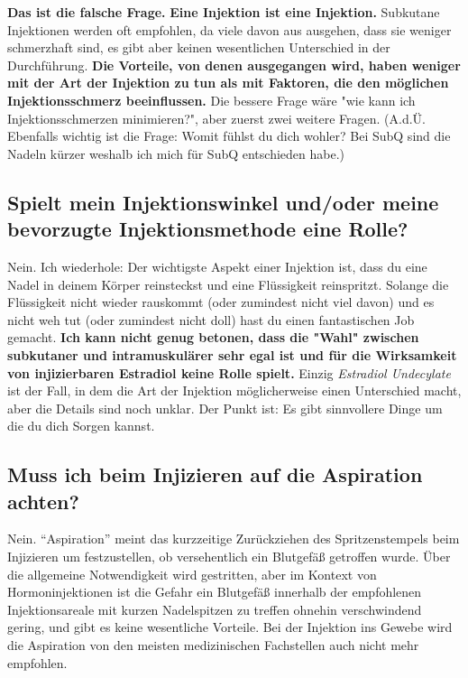 \documentclass{article}
\begin{document}
\textbf{Das ist die falsche Frage.} \textbf{Eine Injektion ist eine Injektion.} Subkutane Injektionen werden oft empfohlen, da viele davon aus ausgehen, dass sie weniger schmerzhaft sind, es gibt aber keinen wesentlichen Unterschied in der Durchführung. \textbf{Die Vorteile, von denen ausgegangen wird, haben weniger mit der Art der Injektion zu tun als mit Faktoren, die den möglichen Injektionsschmerz beeinflussen.} Die bessere Frage wäre "wie kann ich Injektionsschmerzen minimieren?", aber zuerst zwei weitere Fragen. (A.d.Ü. Ebenfalls wichtig ist die Frage: Womit fühlst du dich wohler? Bei SubQ sind die Nadeln kürzer weshalb ich mich für SubQ entschieden habe.)

\subsection{Spielt mein Injektionswinkel und/oder meine bevorzugte Injektionsmethode eine Rolle?}

Nein. Ich wiederhole: Der wichtigste Aspekt einer Injektion ist, dass du eine Nadel in deinem Körper reinsteckst und eine Flüssigkeit reinspritzt. Solange die Flüssigkeit nicht wieder rauskommt (oder zumindest nicht viel davon) und es nicht weh tut (oder zumindest nicht doll) hast du einen fantastischen Job gemacht. \textbf{Ich kann nicht genug betonen, dass die "Wahl" zwischen subkutaner und intramuskulärer sehr egal ist und für die Wirksamkeit von injizierbaren Estradiol keine Rolle spielt.} Einzig \textit{Estradiol Undecylate} ist der Fall, in dem die Art der Injektion möglicherweise einen Unterschied macht, aber die Details sind noch unklar. Der Punkt ist: Es gibt sinnvollere Dinge um die du dich Sorgen kannst.

\subsection{Muss ich beim Injizieren auf die Aspiration achten?}

Nein. “Aspiration” meint das kurzzeitige Zurückziehen des Spritzenstempels beim Injizieren um festzustellen, ob versehentlich ein Blutgefäß getroffen wurde. Über die allgemeine Notwendigkeit wird gestritten, aber im Kontext von Hormoninjektionen ist die Gefahr ein Blutgefäß innerhalb der empfohlenen Injektionsareale mit kurzen Nadelspitzen zu treffen ohnehin verschwindend gering, und gibt es keine wesentliche Vorteile. Bei der Injektion ins Gewebe wird die Aspiration von den meisten medizinischen Fachstellen auch nicht mehr empfohlen.
\end{document}
